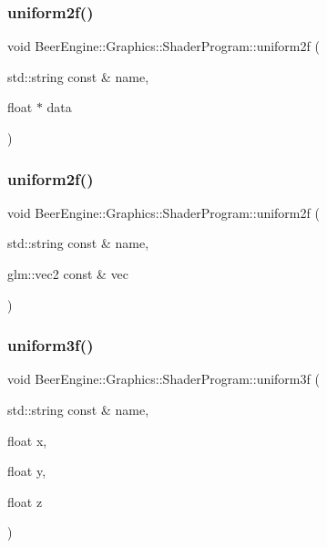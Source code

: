 \subsubsection{\texorpdfstring{uniform2f()}{uniform2f()}\hspace{0.1cm}{\footnotesize\ttfamily [3/4]}}
{\footnotesize\ttfamily void Beer\+Engine\+::\+Graphics\+::\+Shader\+Program\+::uniform2f (\begin{DoxyParamCaption}\item[{std\+::string const \&}]{name,  }\item[{float $\ast$}]{data }\end{DoxyParamCaption})}

\mbox{\label{class_beer_engine_1_1_graphics_1_1_shader_program_a7568ddafee4777ef5776ef8e7967994a}} 
\subsubsection{\texorpdfstring{uniform2f()}{uniform2f()}\hspace{0.1cm}{\footnotesize\ttfamily [4/4]}}
{\footnotesize\ttfamily void Beer\+Engine\+::\+Graphics\+::\+Shader\+Program\+::uniform2f (\begin{DoxyParamCaption}\item[{std\+::string const \&}]{name,  }\item[{glm\+::vec2 const \&}]{vec }\end{DoxyParamCaption})}

\mbox{\label{class_beer_engine_1_1_graphics_1_1_shader_program_a5c040e91d1e70c913e85d34697a1e33f}} 
\subsubsection{\texorpdfstring{uniform3f()}{uniform3f()}\hspace{0.1cm}{\footnotesize\ttfamily [1/4]}}
{\footnotesize\ttfamily void Beer\+Engine\+::\+Graphics\+::\+Shader\+Program\+::uniform3f (\begin{DoxyParamCaption}\item[{std\+::string const \&}]{name,  }\item[{float}]{x,  }\item[{float}]{y,  }\item[{float}]{z }\end{DoxyParamCaption})}

